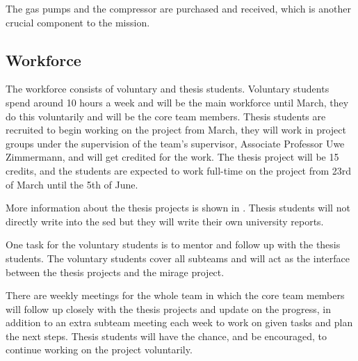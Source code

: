 The gas pumps and the compressor are purchased and received, which is another crucial component to the mission.

\subsection{Workforce}

The workforce consists of voluntary and thesis students. Voluntary students spend around 10 hours a week and will be the main workforce until March, they do this voluntarily and will be the core team members. Thesis students are recruited to begin working on the project from March, they will work in project groups under the supervision of the team's supervisor, Associate Professor Uwe Zimmermann, and will get credited for the work. The thesis project will be 15 credits, and the students are expected to work full-time on the project from 23rd of March until the 5th of June.

More information about the thesis projects is shown in . Thesis students will not directly write into the \gls{sed} but they will write their own university reports.

One task for the voluntary students is to mentor and follow up with the thesis students. The voluntary students cover all subteams and will act as the interface between the thesis projects and the \gls{mirage} project.

There are weekly meetings for the whole team in which the core team members will follow up closely with the thesis projects and update on the progress, in addition to an extra subteam meeting each week to work on given tasks and plan the next steps. Thesis students will have the chance, and be encouraged, to continue working on the project voluntarily.

